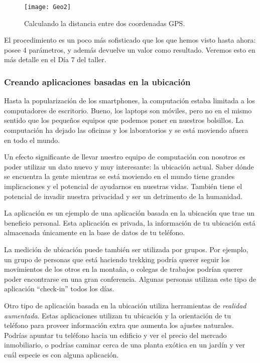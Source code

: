 \begin{figure}[H]
  \centering
  \texttt{[image: Geo2]}
  \caption{Calculando la distancia entre dos coordenadas GPS.}
  \label{fig:Geo2}
\end{figure}

El procedimiento  es un poco más sofisticado que
los que hemos visto hasta ahora: posee 4 parámetros, y además devuelve
un valor como resultado. Veremos esto en más detalle en el Día 7 del
taller.


\subsubsection*{Creando aplicaciones basadas en la ubicación}

Hasta la popularización de los smartphones, la computación estaba
limitada a los computadores de escritorio. Bueno, los laptops son
móviles, pero no en el mismo sentido que los pequeños equipos que
podemos poner en nuestros bolsillos. La computación ha dejado las
oficinas y los laboratorios y se está moviendo afuera en todo el
mundo.

Un efecto significante de llevar nuestro equipo de computación con
nosotros es poder utilizar un dato nuevo y muy interesante: la
ubicación actual. Saber dónde se encuentra la gente mientras se está
moviendo en el mundo tiene grandes implicaciones y el potencial de
ayudarnos en nuestras vidas.  También tiene el potencial de invadir
nuestra privacidad y ser un detrimento de la humanidad.

La aplicación  es un ejemplo de una
aplicación basada en la ubicación que trae un beneficio personal. Esta
aplicación es privada, la información de tu ubicación está almacenada
únicamente en la base de datos de tu teléfono.

La medición de ubicación puede también ser utilizada por grupos. Por
ejemplo, un grupo de personas que está haciendo trekking podría querer
seguir los movimientos de los otros en la montaña, o colegas de
trabajos podrían querer poder encontrarse en una gran conferencia.
Algunas personas utilizan este tipo de aplicación ``check-in'' todos
los días.

Otro tipo de aplicación basada en la ubicación utiliza herramientas de
\emph{realidad aumentada}. Estas aplicaciones utilizan tu ubicación y
la orientación de tu teléfono para proveer información extra que
aumenta los ajustes naturales. Podrías apuntar tu teléfono hacia un
edificio y ver el precio del mercado inmobiliario, o podrías caminar
cerca de una planta exótica en un jardín y ver cuál especie es con
alguna aplicación.

